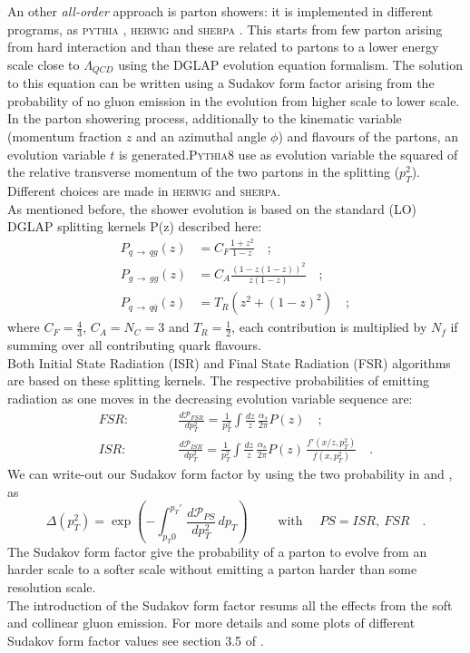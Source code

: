 An other \textit{all-order} approach is parton showers: it is  implemented in different programs, as  \textsc{pythia} \cite{PYTHIA2015}, \textsc{herwig} \cite{Herwig2008} and \textsc{sherpa} \cite{SHERPA2004}. This starts from few parton arising from hard interaction and than these are related to partons to a lower energy scale close to $\Lambda_{QCD}$ using the DGLAP evolution equation formalism. The solution to this equation can be written using a Sudakov form factor arising from the probability of no gluon emission in the evolution from higher scale to lower scale.
\\
In the parton showering process, additionally to the kinematic variable (momentum fraction $z$ and an azimuthal angle $\phi$) and flavours of the partons, an evolution variable $t$ is generated.\textsc{Pythia8} use as  evolution variable the squared of the relative transverse momentum of the two partons in the splitting ($p_T^2$). Different choices are made in \textsc{herwig} and \textsc{sherpa}.
\\
As mentioned before, the shower evolution is based on the standard (LO) DGLAP splitting kernels P(z) described here:
\begin{align}
P_{q\,\rightarrow\,qg}(z) & = C_F\frac{1+z^2}{1-z}\quad ; \\
P_{g\,\rightarrow\,gg}(z) & = C_A\frac{(1-z(1-z))^2}{z(1-z)}\quad ; \\
P_{q\,\rightarrow\,q\overline{q}}(z) & = T_R(z^2+(1-z)^2)\quad ;
\end{align} 
where $C_F=\frac{4}{3}$, $C_A=N_C=3$ and $T_R=\frac{1}{2}$, each contribution is multiplied by $N_f$ if summing over all contributing quark flavours.
\\
Both Initial State Radiation (ISR) and Final State Radiation (FSR) algorithms are based on these splitting kernels.
The respective probabilities of emitting radiation as one moves in the decreasing evolution variable sequence are:
\begin{align}
	FSR: \qquad\quad & \frac{d\mathcal{P}_{FSR}}{dp_T^2} = \frac{1}{p_T^2}\displaystyle\int \frac{dz}{z}\,\frac{\alpha_s}{2\pi}P(z)\quad ;\label{eq:FSR1}\\
	ISR: \qquad\quad & \frac{d\mathcal{P}_{ISR}}{dp_T^2} = \frac{1}{p_T^2}\displaystyle\int \frac{dz}{z}\,\frac{\alpha_s}{2\pi}P(z)\,\frac{f'(x/z,p_T^2)}{f(x,p_T^2)}\quad .\label{eq:ISR1}
\end{align}
We can write-out our Sudakov form factor by using the two probability in  and , as
\begin{equation}
	\Delta(p_T^2)=\exp\left( -\displaystyle\int_{p_T0}^{p_T'} \frac{d\mathcal{P}_{PS}}{dp_T^2} \,dp_T\right) \qquad\text{ with } \quad PS=ISR,\ FSR \quad.
	\label{eq:sudakovFormFactor}
\end{equation}
The Sudakov form factor give the probability of a parton to evolve from an harder scale to a softer scale without emitting a parton harder than some resolution scale. 
\\
The introduction of the Sudakov form factor resums all the effects from the soft and collinear gluon emission. For more details and some plots of different Sudakov form factor values see section 3.5 of \cite{Campbell2006}.

